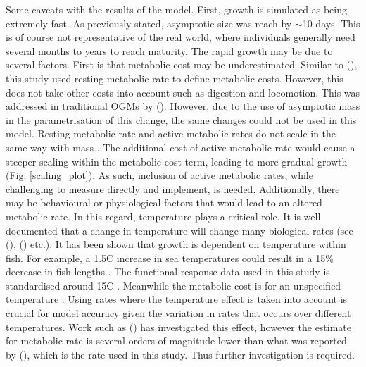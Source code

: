 \documentclass[a4paper, 11pt, hidelinks]{article} %
\begin{document}
	
	
	Some caveats with the results of the model.  First, growth is simulated as being extremely fast.  As previously stated, asymptotic size was reach by $\sim$10 days.  This is of course not representative of the real world, where individuals generally need several months to years to reach maturity.	
	The rapid growth may be due to several factors.  First is that metabolic cost may be underestimated.  Similar to \citeauthor{West2001} (\citeyear{West2001}), this study used resting metabolic rate to define metabolic costs.  However, this does not take other costs into account such as digestion and locomotion.
	This was addressed in traditional OGMs by \citeauthor{Hou2008} (\citeyear{Hou2008}).  However, due to the use of asymptotic mass in the parametrisation of this change, the same changes could not be used in this model.  Resting metabolic rate and active metabolic rates do not scale in the same way with mass \parencite{Gillooly2001, Weibel2004}.  The additional cost of active metabolic rate would cause a steeper scaling within the metabolic cost term, leading to more gradual growth (Fig. \ref{scaling_plot}). 
	As such, inclusion of active metabolic rates, while challenging to measure directly and implement, is needed.
	Additionally, there may be behavioural or physiological factors that would lead to an altered metabolic rate.  
	In this regard, temperature plays a critical role.  It is well documented that a change in temperature will change many biological rates  (see \citeauthor{Peters1983} (\citeyear{Peters1983}), \citeauthor{Gillooly2001} (\citeyear{Gillooly2001}) etc.).  
	It has been shown that growth is dependent on temperature within fish. %
	For example, a 1.5\textdegree{}C increase in sea temperatures could result in a 15\% decrease in fish lengths \parencite{VanRijn2017}. %
	The functional response data used in this study is standardised around 15\textdegree{}C \parencite{Pawar2012}.
	Meanwhile the metabolic cost is for an unspecified temperature \parencite{Peters1983}.  Using rates where the temperature effect is taken into account is crucial for model accuracy given the variation in rates that occurs over different temperatures.  Work such as \citeauthor{Barneche2014} (\citeyear{Barneche2014}) has investigated this effect, however the estimate for metabolic rate is several orders of magnitude lower than what was reported by \citeauthor{Peters1983} (\citeyear{Peters1983}), which is the rate used in this study.  Thus further investigation is required.  %
	
\end{document}
